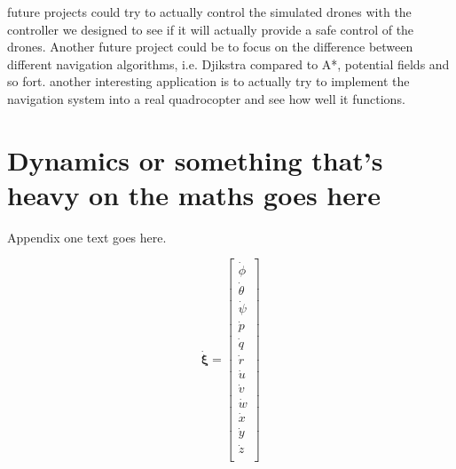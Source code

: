 \documentclass[journal]{IEEEtran}
\begin{document}
	future projects could try to actually control the simulated drones with the controller we designed to see if it will actually provide a safe control of the drones. Another future project could be to focus on the difference between different navigation algorithms, i.e. Djikstra compared to A*, potential fields and so fort. another interesting application is to actually try to implement the navigation system into a real quadrocopter and see how well it functions.	
	
	
	
	
	
	\appendices
	\section{Dynamics or something that's heavy on the maths goes here}
	Appendix one text goes here.
	
		\begin{equation} \label{eq:derivpos_earth_body}
	\bm{\dot \xi} = \left[ {\begin{array}{c}
		\dot \phi\\
		\dot \theta\\
		\dot \psi\\
		\dot p\\
		\dot q\\
		\dot r\\
		\dot u\\
		\dot v\\
		\dot w\\
		\dot x\\
		\dot y\\
		\dot z\\
		
		\end{array} } \right]
	\end{equation}
	
\end{document}
